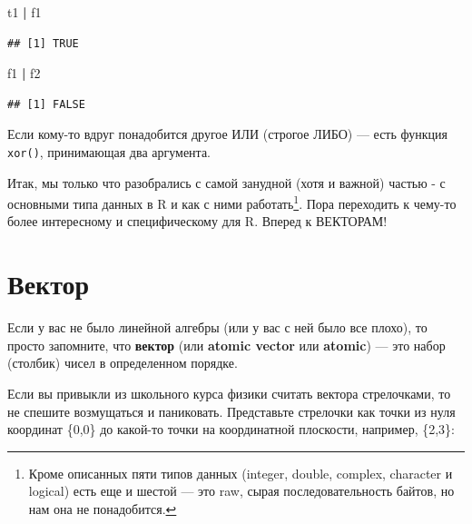 \documentclass[
]{book}
\newenvironment{Shaded}{\begin{snugshade}}{\end{snugshade}}
\newcommand{\NormalTok}[1]{#1}
\newcommand{\OperatorTok}[1]{\textcolor[rgb]{0.81,0.36,0.00}{\textbf{#1}}}
\newcommand{\StringTok}[1]{\textcolor[rgb]{0.31,0.60,0.02}{#1}}
\begin{document}
\begin{Shaded}
\begin{Highlighting}[]
\NormalTok{t1 }\OperatorTok{|}\StringTok{ }\NormalTok{f1}
\end{Highlighting}
\end{Shaded}

\begin{verbatim}
## [1] TRUE
\end{verbatim}

\begin{Shaded}
\begin{Highlighting}[]
\NormalTok{f1 }\OperatorTok{|}\StringTok{ }\NormalTok{f2}
\end{Highlighting}
\end{Shaded}

\begin{verbatim}
## [1] FALSE
\end{verbatim}

Если кому-то вдруг понадобится другое ИЛИ (строгое ЛИБО) --- есть функция \texttt{xor()}, принимающая два аргумента.

Итак, мы только что разобрались с самой занудной (хотя и важной) частью - с основными типа данных в R и как с ними работать\footnote{Кроме описанных пяти типов данных (integer, double, complex, character и logical) есть еще и шестой --- это raw, сырая последовательность байтов, но нам она не понадобится.}. Пора переходить к чему-то более интересному и специфическому для R. Вперед к ВЕКТОРАМ!

\hypertarget{atomic}{%
\section{Вектор}\label{atomic}}

Если у вас не было линейной алгебры (или у вас с ней было все плохо), то просто запомните, что \textbf{вектор} (или \textbf{atomic vector} или \textbf{atomic}) --- это набор (столбик) чисел в определенном порядке.

Если вы привыкли из школьного курса физики считать вектора стрелочками, то не спешите возмущаться и паниковать. Представьте стрелочки как точки из нуля координат \{0,0\} до какой-то точки на координатной плоскости, например, \{2,3\}:
\end{document}
